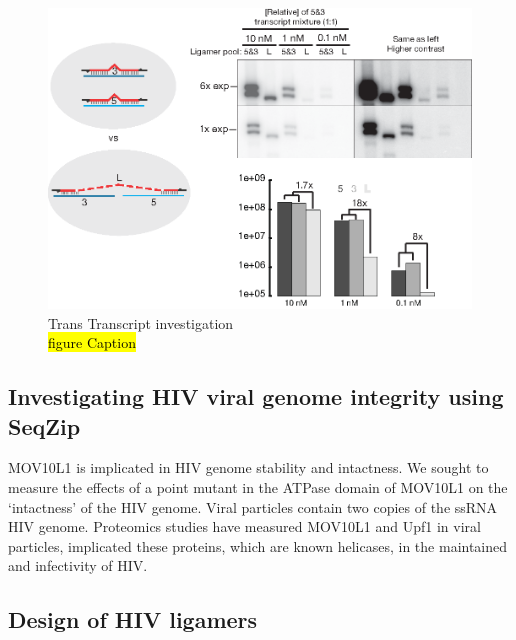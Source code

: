\begin{figure}[htbp]
	\centering 
	\includegraphics{Figures/Chapter2/TransRNAWithSeqZip.eps}
	\caption[Trans Transcript investigation]
	{
		Trans Transcript investigation\\
		\hl{figure Caption}
	}
	\label{fig:Ligation product and RNA integrity}
\end{figure}

\subsection{Investigating HIV viral genome integrity using SeqZip}\label{subsec: HIV}



MOV10L1 is implicated in HIV genome stability and intactness. We sought to measure the effects of a point mutant in the ATPase domain of MOV10L1 on the ‘intactness’ of the HIV genome. Viral particles contain two copies of the ssRNA HIV genome. Proteomics studies have measured MOV10L1 and Upf1 in viral particles, implicated these proteins, which are known helicases, in the maintained and infectivity of HIV.

\subsection{Design of HIV ligamers}

